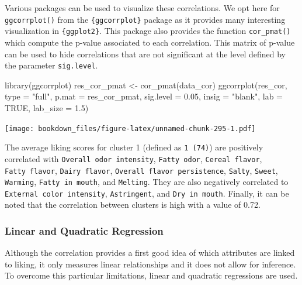\documentclass[
]{krantz}
\makeatletter
\newenvironment{Shaded}{\begin{snugshade}}{\end{snugshade}}
\newcommand{\AttributeTok}[1]{\textcolor[rgb]{0.61,0.61,0.61}{#1}}
\newcommand{\ConstantTok}[1]{\textcolor[rgb]{0,0,0}{#1}}
\newcommand{\FloatTok}[1]{\textcolor[rgb]{0.06,0.06,0.06}{#1}}
\newcommand{\FunctionTok}[1]{\textcolor[rgb]{0,0,0}{#1}}
\newcommand{\NormalTok}[1]{#1}
\newcommand{\OtherTok}[1]{\textcolor[rgb]{0.37,0.37,0.37}{#1}}
\newcommand{\StringTok}[1]{\textcolor[rgb]{0.5,0.5,0.5}{#1}}
\newenvironment{kframe}{%
\medskip{}
\setlength{\fboxsep}{.8em}
 \def\at@end@of@kframe{}%
 \ifinner\ifhmode%
  \def\at@end@of@kframe{\end{minipage}}%
  \begin{minipage}{\columnwidth}%
 \fi\fi%
 \def\FrameCommand##1{\hskip\@totalleftmargin \hskip-\fboxsep
 \colorbox{shadecolor}{##1}\hskip-\fboxsep
     \hskip-\linewidth \hskip-\@totalleftmargin \hskip\columnwidth}%
 \MakeFramed {\advance\hsize-\width
   \@totalleftmargin\z@ \linewidth\hsize
   \@setminipage}}%
 {\par\unskip\endMakeFramed%
 \at@end@of@kframe}
\renewenvironment{Shaded}{\begin{kframe}}{\end{kframe}}
\makeatother
\begin{document}
Various packages can be used to visualize these correlations. We opt here for \texttt{ggcorrplot()} from the \texttt{\{ggcorrplot\}} package as it provides many interesting visualization in \texttt{\{ggplot2\}}. This package also provides the function \texttt{cor\_pmat()} which compute the p-value associated to each correlation. This matrix of p-value can be used to hide correlations that are not significant at the level defined by the parameter \texttt{sig.level}.

\begin{Shaded}
\begin{Highlighting}[]
\FunctionTok{library}\NormalTok{(ggcorrplot)}
\NormalTok{res\_cor\_pmat }\OtherTok{\textless{}{-}} \FunctionTok{cor\_pmat}\NormalTok{(data\_cor)}
\FunctionTok{ggcorrplot}\NormalTok{(res\_cor, }\AttributeTok{type =} \StringTok{"full"}\NormalTok{, }\AttributeTok{p.mat =}\NormalTok{ res\_cor\_pmat, }
           \AttributeTok{sig.level =} \FloatTok{0.05}\NormalTok{, }\AttributeTok{insig =} \StringTok{"blank"}\NormalTok{, }
           \AttributeTok{lab =} \ConstantTok{TRUE}\NormalTok{, }\AttributeTok{lab\_size =} \FloatTok{1.5}\NormalTok{)}
\end{Highlighting}
\end{Shaded}

\texttt{[image: bookdown\_files/figure-latex/unnamed-chunk-295-1.pdf]}

The average liking scores for cluster 1 (defined as \texttt{1\ (74)}) are positively correlated with \texttt{Overall\ odor\ intensity}, \texttt{Fatty\ odor}, \texttt{Cereal\ flavor}, \texttt{Fatty\ flavor}, \texttt{Dairy\ flavor}, \texttt{Overall\ flavor\ persistence}, \texttt{Salty}, \texttt{Sweet}, \texttt{Warming}, \texttt{Fatty\ in\ mouth}, and \texttt{Melting}. They are also negatively correlated to \texttt{External\ color\ intensity}, \texttt{Astringent}, and \texttt{Dry\ in\ mouth}.
Finally, it can be noted that the correlation between clusters is high with a value of 0.72.

\hypertarget{linear-and-quadratic-regression}{%
\subsubsection{Linear and Quadratic Regression}\label{linear-and-quadratic-regression}}

Although the correlation provides a first good idea of which attributes are linked to liking, it only measures linear relationships and it does not allow for inference. To overcome this particular limitations, linear and quadratic regressions are used.
\end{document}
